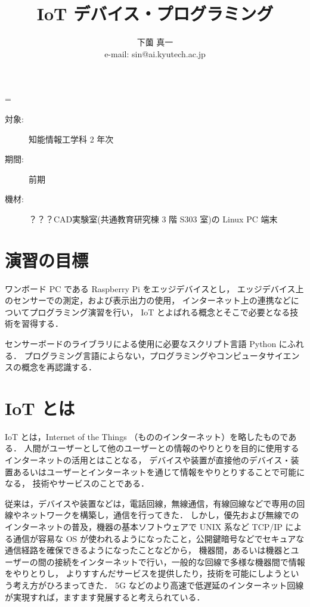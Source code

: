 \documentclass[11pt,a4,epsf]{report}
\title{{\bf IoT デバイス・プログラミング}}
\author{下薗 真一\\
e-mail: {\sf sin@ai.kyutech.ac.jp}\\
}
\def\linesparpage#1{\baselineskip=\textheight\divide\baselineskip#1}
\begin{document}
\linesparpage{36}
\maketitle

\medskip

\begin{description}
\item[対象:] 知能情報工学科 2 年次
\item[期間:] 前期
\item[機材:] ？？？CAD実験室(共通教育研究棟 3 階 S303 室)の Linux PC 端末%
\end{description}

\medskip

\section{演習の目標}

ワンボード PC である Raspberry Pi をエッジデバイスとし，
エッジデバイス上のセンサーでの測定，および表示出力の使用，
インターネット上の連携などについてプログラミング演習を行い，
IoT とよばれる概念とそこで必要となる技術を習得する．

センサーボードのライブラリによる使用に必要なスクリプト言語 Python にふれる．
プログラミング言語によらない，プログラミングやコンピュータサイエンスの概念を再認識する．

\section{IoT とは}

IoT とは，Internet of the Things （もののインターネット）を略したものである．
人間がユーザーとして他のユーザーとの情報のやりとりを目的に使用するインターネットの活用とはことなる，
デバイスや装置が直接他のデバイス・装置あるいはユーザーとインターネットを通じて情報をやりとりすることで可能になる，
技術やサービスのことである．

従来は，デバイスや装置などは，電話回線，無線通信，有線回線などで専用の回線やネットワークを構築し，通信を行ってきた．
しかし，優先および無線でのインターネットの普及，機器の基本ソフトウェアで UNIX 系など TCP/IP による通信が容易な OS が使われるようになったこと，公開鍵暗号などでセキュアな通信経路を確保できるようになったことなどから，
機器間，あるいは機器とユーザーの間の接続をインターネットで行い，一般的な回線で多様な機器間で情報をやりとりし，
よりすすんだサービスを提供したり，技術を可能にしようという考え方がひろまってきた．
5G などのより高速で低遅延のインターネット回線が実現すれば，ますます発展すると考えられている．
\end{document}
